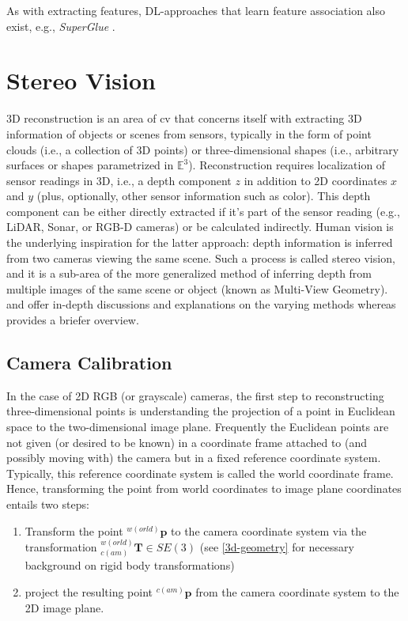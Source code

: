 \documentclass[headsepline, hidelinks, footsepline, footinclude=false, oneside, fontsize=11pt, paper=a4, listof=totoc, bibliography=totoc]{scrbook}
\begin{document}
As with extracting features, DL-approaches that learn feature association also exist, e.g., \emph{SuperGlue} \cite{sarlinSuperGlueLearningFeature2020}.

\section{Stereo Vision \label{stereo-vision}}
\label{sec:orga1c4bcf}
   3D reconstruction is an area of \gls{cv} that concerns itself with extracting 3D information of objects or scenes from sensors, typically in the form of point clouds (i.e., a collection of 3D points)
or three-dimensional shapes (i.e., arbitrary surfaces or shapes parametrized in \(\mathbb{E}^3\)).
Reconstruction requires localization of sensor readings in 3D, i.e., a depth component \(z\) in addition to 2D coordinates \(x\) and \(y\) (plus, optionally, other sensor information such as color).
This depth component can be either directly extracted if it's part of the sensor reading (e.g., LiDAR, Sonar, or RGB-D cameras) or be calculated indirectly. Human vision is the underlying inspiration for the latter approach: depth information is inferred from two cameras viewing the same scene. Such a process is called stereo vision, and it is a sub-area of the more generalized method of inferring depth from multiple images of the same scene or object (known as Multi-View Geometry). 
\cite{hartleyMultipleViewGeometry2004} and \cite{jahneComputerVisionApplications2000} offer in-depth discussions and explanations on the varying methods whereas \cite{moons3DReconstructionMultiple2008} provides a briefer overview.

\subsection{Camera Calibration \label{camera-calibration}}
\label{sec:org548782b}
    In the case of 2D RGB (or grayscale) cameras, the first step to reconstructing three-dimensional points is understanding the projection of a point in Euclidean space to the two-dimensional image plane.
Frequently the Euclidean points are not given (or desired to be known) in a coordinate frame attached to (and possibly moving with) the camera but in a fixed reference coordinate system. 
Typically, this reference coordinate system is called the world coordinate frame.
Hence, transforming the point from world coordinates to image plane coordinates entails two steps:

\begin{enumerate}
\item Transform the point \({}^{w(orld)}\mathbf{p}\) to the camera coordinate system via the transformation \({}^{w(orld)}_{c(am)}\mathbf{T} \in SE(3)\) (see \cref{3d-geometry} for necessary background on rigid body transformations)
\item project the resulting point \({}^{c(am)}\mathbf{p}\) from the camera coordinate system to the 2D image plane.
\end{enumerate}
\end{document}
